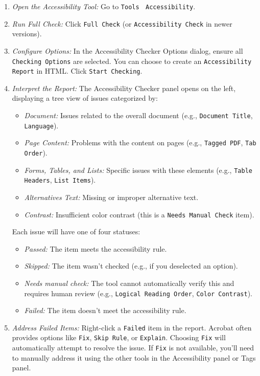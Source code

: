 \begin{enumerate}
\item \emph{Open the Accessibility Tool:} Go to \texttt{Tools} $\>$ \texttt{Accessibility}.
\item \emph{Run Full Check:} Click \texttt{Full Check} (or \texttt{Accessibility Check} in newer versions).
\item \emph{Configure Options:} In the Accessibility Checker Options dialog, ensure all \texttt{Checking Options} are selected. You can choose to create an \texttt{Accessibility Report} in HTML. Click \texttt{Start Checking}.
\item \emph{Interpret the Report:} The Accessibility Checker panel opens on the left, displaying a tree view of issues categorized by:
    \begin{itemize}
    \item \emph{Document:} Issues related to the overall document (e.g., \texttt{Document Title}, \texttt{Language}).
    \item \emph{Page Content:} Problems with the content on pages (e.g., \texttt{Tagged PDF}, \texttt{Tab Order}).
    \item \emph{Forms, Tables, and Lists:} Specific issues with these elements (e.g., \texttt{Table Headers}, \texttt{List Items}).
    \item \emph{Alternatives Text:} Missing or improper alternative text.
    \item \emph{Contrast:} Insufficient color contrast (this is a \texttt{Needs Manual Check} item).
    \end{itemize}
    Each issue will have one of four statuses:\cite{AdobeAccessGuide}
    \begin{itemize}
    \item \emph{Passed:} The item meets the accessibility rule.
    \item \emph{Skipped:} The item wasn't checked (e.g., if you deselected an option).
    \item \emph{Needs manual check:} The tool cannot automatically verify this and requires human review (e.g., \texttt{Logical Reading Order}, \texttt{Color Contrast}).
    \item \emph{Failed:} The item doesn't meet the accessibility rule.
    \end{itemize}
\item \emph{Address Failed Items:} Right-click a \texttt{Failed} item in the report. Acrobat often provides options like \texttt{Fix}, \texttt{Skip Rule}, or \texttt{Explain}. Choosing \texttt{Fix} will automatically attempt to resolve the issue. If \texttt{Fix} is not available, you'll need to manually address it using the other tools in the Accessibility panel or Tags panel.
\end{enumerate}

